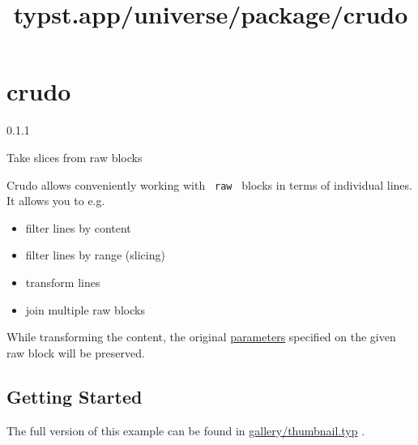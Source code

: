 \title{typst.app/universe/package/crudo}

\label{banner}
\section{crudo}\label{crudo}

{ 0.1.1 }

Take slices from raw blocks

\label{readme}
Crudo allows conveniently working with \texttt{\ raw\ } blocks in terms
of individual lines. It allows you to e.g.

\begin{itemize}
\tightlist
\item
  filter lines by content
\item
  filter lines by range (slicing)
\item
  transform lines
\item
  join multiple raw blocks
\end{itemize}

While transforming the content, the original
\href{https://typst.app/docs/reference/text/raw/\#parameters}{parameters}
specified on the given raw block will be preserved.

\subsection{Getting Started}\label{getting-started}

The full version of this example can be found in
\href{https://github.com/typst/packages/raw/main/packages/preview/crudo/0.1.1/gallery/thumbnail.typ}{gallery/thumbnail.typ}
.

\begin{Shaded}
\begin{Highlighting}[]


\NormalTok{\textasciigrave{}\textasciigrave{}\textasciigrave{}}


\NormalTok{\}}
\NormalTok{\textasciigrave{}\textasciigrave{}\textasciigrave{})}
\NormalTok{\textasciigrave{}\textasciigrave{}\textasciigrave{}\textasciigrave{}}




\end{Highlighting}
\end{Shaded}

